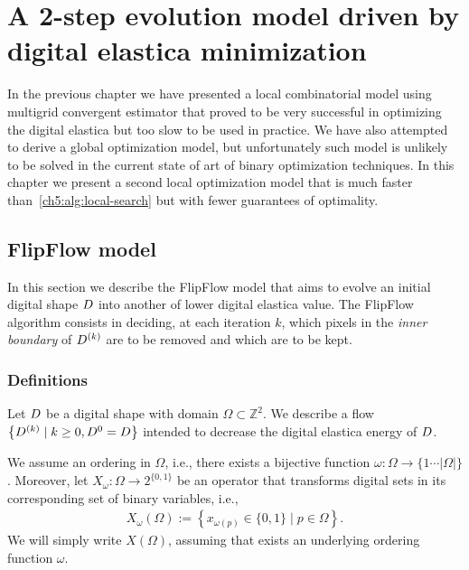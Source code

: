 \chapter{A 2-step evolution model driven by digital elastica minimization}
\label{chapter:flip-flow}

In the previous chapter we have presented a local combinatorial model using multigrid convergent estimator that proved to be very successful in optimizing the digital elastica but too slow to be used in practice. We have also attempted to derive a global optimization model, but unfortunately such model is unlikely to be solved in the current state of art of binary optimization techniques. In this chapter we present a second local optimization model that is much faster than~\cref{ch5:alg:local-search} but with fewer guarantees of optimality.



\section{FlipFlow model}
\label{ch6:sec:flipflow-model}

In this section we describe the FlipFlow model that aims to evolve an initial digital shape $D$ into another of lower digital elastica value. The FlipFlow algorithm consists in deciding, at each iteration $k$, which pixels in the \emph{inner boundary} of $D^{(k)}$ are to be removed  and which are to be kept. 

\subsection{Definitions}
\label{ch6:subsec:definitions}

Let $D$ be a digital shape with domain $\Omega \subset \mathbb{Z}^2$. We describe a flow $\left \{ D^{(k)} \; | \; k \geq 0, D^{0} = D \right\}$ intended to decrease the digital elastica energy of $D$.

We assume an ordering in $\Omega$, i.e., there exists a bijective function $\omega : \Omega \rightarrow \{1 \cdots |\Omega| \}$. Moreover, let $X_{\omega}:\Omega \rightarrow 2^{\{0,1\}}$ be an operator that transforms digital sets in its corresponding set of binary variables, i.e.,
\begin{align*}
	X_{\omega}(\Omega) := \left\{ x_{\omega(p)} \in \{0,1\} \; | \; p \in \Omega \right\}.
\end{align*}
%
We will simply write $X(\Omega)$, assuming that exists an underlying ordering function $\omega$.

